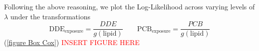 \documentclass[wcp]{jmlr}%
\newcommand\todo[1]{\textcolor{red}{#1}}
\begin{document}
Following the above reasoning, we plot the Log-Likelihood across varying levels of $\lambda$  under the transformations
\begin{equation}
\textrm{DDE}_{\text{exposure}} = \frac{DDE}{g(\text{lipid})} \qquad \textrm{PCB}_{\text{exposure}} = \frac{PCB}{g(\text{lipid})}
\end{equation} (\ref{figure Box Cox})
\todo{INSERT FIGURE HERE}













%
\end{document}
